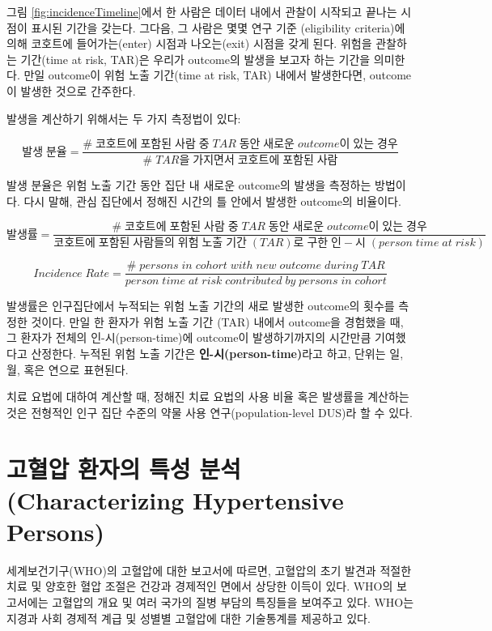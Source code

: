 \documentclass[11pt]{book}
\theoremstyle{definition}
\theoremstyle{definition}
\theoremstyle{definition}
\theoremstyle{remark}
\begin{document}
그림 \ref{fig:incidenceTimeline}에서 한 사람은 데이터 내에서 관찰이
시작되고 끝나는 시점이 표시된 기간을 갖는다. 그다음, 그 사람은 몇몇 연구
기준 (eligibility criteria)에 의해 코호트에 들어가는(enter) 시점과
나오는(exit) 시점을 갖게 된다. 위험을 관찰하는 기간(time at risk, TAR)은
우리가 outcome의 발생을 보고자 하는 기간을 의미한다. 만일 outcome이 위험
노출 기간(time at risk, TAR) 내에서 발생한다면, outcome이 발생한 것으로
간주한다.

발생을 계산하기 위해서는 두 가지 측정법이 있다:

\[ 
발생\;분율 = \frac{\#\;코호트에\;포함된\;사람\;중\;TAR\;동안\;새로운\;outcome이\;있는\;경우}{\#\;TAR을\;가지면서\;코호트에\;포함된\;사람}
\]

발생 분율은 위험 노출 기간 동안 집단 내 새로운 outcome의 발생을 측정하는
방법이다. 다시 말해, 관심 집단에서 정해진 시간의 틀 안에서 발생한
outcome의 비율이다. 

\[
발생률 = \frac{\#\;코호트에\;포함된\;사람\;중\;TAR\;동안\;새로운\;outcome이\;있는\;경우}{코호트에\;포함된\;사람들의\;위험\;노출\;기간\;(TAR)로\;구한\;인-시\;(person\;time\;at\;risk)}
\]

\[
Incidence\;Rate = \frac{\#\;persons\;in\;cohort\;with\;new\;outcome\;during\;TAR}{person\;time\;at\;risk\;contributed\;by\;persons\;in\;cohort}
\]

발생률은 인구집단에서 누적되는 위험 노출 기간의 새로 발생한 outcome의
횟수를 측정한 것이다. 만일 한 환자가 위험 노출 기간 (TAR) 내에서
outcome을 경험했을 때, 그 환자가 전체의 인-시(person-time)에 outcome이
발생하기까지의 시간만큼 기여했다고 산정한다. 누적된 위험 노출 기간은
\textbf{인-시(person-time)}라고 하고, 단위는 일, 월, 혹은 연으로
표현된다.  

치료 요법에 대하여 계산할 때, 정해진 치료 요법의 사용 비율 혹은 발생률을
계산하는 것은 전형적인 인구 집단 수준의 약물 사용 연구(population-level
DUS)라 할 수 있다.

\section{고혈압 환자의 특성 분석 (Characterizing Hypertensive
Persons)}\label{----characterizing-hypertensive-persons}

세계보건기구(WHO)의 고혈압에 대한 보고서\citep{WHOHypertension}에
따르면, 고혈압의 초기 발견과 적절한 치료 및 양호한 혈압 조절은 건강과
경제적인 면에서 상당한 이득이 있다. WHO의 보고서에는 고혈압의 개요 및
여러 국가의 질병 부담의 특징들을 보여주고 있다. WHO는 지경과 사회 경제적
계급 및 성별별 고혈압에 대한 기술통계를 제공하고 있다.
\end{document}
